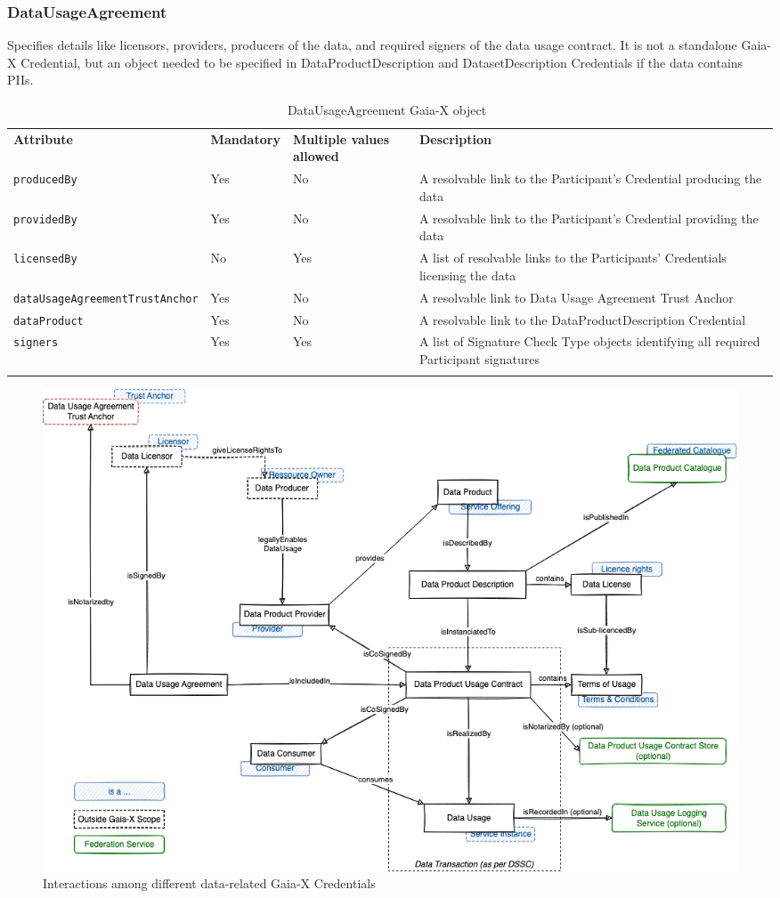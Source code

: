 \subsubsection{DataUsageAgreement}

Specifies details like licensors, providers, producers of the data, and required signers of the data usage contract.
It is not a standalone Gaia-X Credential, but an object needed to be specified in DataProductDescription and DatasetDescription Credentials if the data contains PIIs.

\begin{longtable}{ |p{4cm}|p{2cm}|p{2cm}|p{7cm}| }
    \hhline{----}
    \textbf{Attribute} & \textbf{Mandatory} & \textbf{Multiple values allowed} & \textbf{Description}\\
    \hhline{----}
    \texttt{producedBy} & Yes & No & A resolvable link to the Participant's Credential producing the data\\
    \hhline{----}
    \texttt{providedBy} & Yes & No & A resolvable link to the Participant's Credential providing the data\\
    \hhline{----}
    \texttt{licensedBy} & No & Yes & A list of resolvable links to the Participants' Credentials licensing the data\\
    \hhline{----}
    \texttt{dataUsageAgreementTrustAnchor} & Yes & No & A resolvable link to Data Usage Agreement Trust Anchor\\
    \hhline{----}
    \texttt{dataProduct} & Yes & No & A resolvable link to the DataProductDescription Credential\\
    \hhline{----}
    \texttt{signers} & Yes & Yes & A list of Signature Check Type objects identifying all required Participant signatures\\
    \hhline{----}
    \caption{DataUsageAgreement Gaia-X object~\cite{gaiax_data_exchange_document}}
    \label{tab:data_usage_agreement}
\end{longtable}

\begin{figure}
    \centering
    \includegraphics[width=\textwidth]{figures/data-product-conceptual-model.png}
    \caption{Interactions among different data-related Gaia-X Credentials~\cite{gaiax_architecture_document}}\label{fig:data_product_conteptual_model}
\end{figure}

